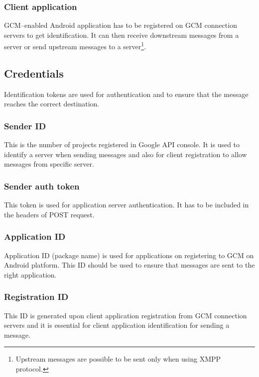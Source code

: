 \subsubsection{Client application}\vspace{-0.5em}
GCM--enabled Android application has to be registered on GCM connection servers to get identification. It can then receive downstream messages from a server or send upstream messages to a server\footnote{Upstream messages are possible to be sent only when using XMPP protocol.}.

\subsection{Credentials}
Identification tokens are used for authentication and to ensure that the message reaches the correct destination.

\subsubsection{Sender ID}\vspace{-0.5em}
This is the number of projects registered in Google API console. It is used to identify a server when sending messages and also for client registration to allow messages from specific server.

\subsubsection{Sender auth token}\vspace{-0.5em}
This token is used for application server authentication. It has to be included in the headers of POST request.

\subsubsection{Application ID}\vspace{-0.5em}
Application ID (package name) is used for applications on registering to GCM on Android platform. This ID should be used to ensure that messages are sent to the right application.

\subsubsection{Registration ID}\vspace{-0.5em}
This ID is generated upon client application registration from GCM connection servers and it is essential for client application identification for sending a message.


